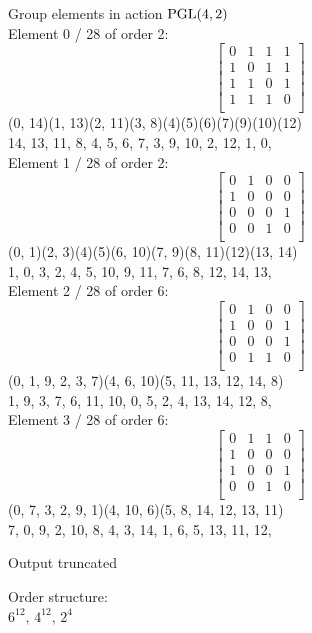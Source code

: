 Group elements in action ${\rm PGL}(4,2)$\\
Element     0 / 28 of order 2:
$$
\left[
\begin{array}{*{4}{r}}
0 & 1 & 1 & 1\\
1 & 0 & 1 & 1\\
1 & 1 & 0 & 1\\
1 & 1 & 1 & 0\\
\end{array}
\right]
$$
(0, 14)(1, 13)(2, 11)(3, 8)(4)(5)(6)(7)(9)(10)(12)\\
14, 13, 11, 8, 4, 5, 6, 7, 3, 9, 10, 2, 12, 1, 0, \\
Element     1 / 28 of order 2:
$$
\left[
\begin{array}{*{4}{r}}
0 & 1 & 0 & 0\\
1 & 0 & 0 & 0\\
0 & 0 & 0 & 1\\
0 & 0 & 1 & 0\\
\end{array}
\right]
$$
(0, 1)(2, 3)(4)(5)(6, 10)(7, 9)(8, 11)(12)(13, 14)\\
1, 0, 3, 2, 4, 5, 10, 9, 11, 7, 6, 8, 12, 14, 13, \\
Element     2 / 28 of order 6:
$$
\left[
\begin{array}{*{4}{r}}
0 & 1 & 0 & 0\\
1 & 0 & 0 & 1\\
0 & 0 & 0 & 1\\
0 & 1 & 1 & 0\\
\end{array}
\right]
$$
(0, 1, 9, 2, 3, 7)(4, 6, 10)(5, 11, 13, 12, 14, 8)\\
1, 9, 3, 7, 6, 11, 10, 0, 5, 2, 4, 13, 14, 12, 8, \\
Element     3 / 28 of order 6:
$$
\left[
\begin{array}{*{4}{r}}
0 & 1 & 1 & 0\\
1 & 0 & 0 & 0\\
1 & 0 & 0 & 1\\
0 & 0 & 1 & 0\\
\end{array}
\right]
$$
(0, 7, 3, 2, 9, 1)(4, 10, 6)(5, 8, 14, 12, 13, 11)\\
7, 0, 9, 2, 10, 8, 4, 3, 14, 1, 6, 5, 13, 11, 12, \\

\bigskip


Output truncated\\

\bigskip

Order structure:\\
$
6^{12},\, 4^{12},\, 2^4 $
\\

